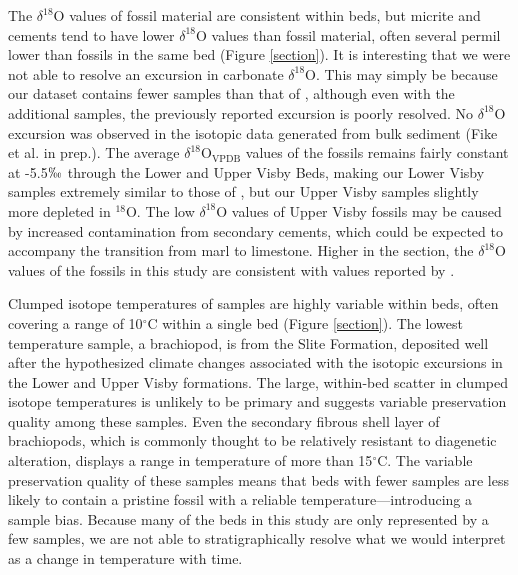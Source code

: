 \documentclass[5p, authoryear]{elsarticle}
\begin{document}
The $\delta^{18}$O values of fossil material are consistent within beds, but micrite and cements tend to have lower $\delta^{18}$O values than fossil material, often several permil lower than fossils in the same bed (Figure \ref{section}). It is interesting that we were not able to resolve an excursion in carbonate $\delta^{18}$O. This may simply be because our dataset contains fewer samples than that of \cite{Munnecke2003}, although even with the additional samples, the previously reported excursion is poorly resolved. No $\delta^{18}$O excursion was observed in the isotopic data generated from bulk sediment (Fike et al. in prep.). The average $\delta^{18}$O$_{\text{VPDB}}$ values of the fossils remains fairly constant at -5.5$\permil$ through the Lower and Upper Visby Beds, making our Lower Visby samples extremely similar to those of \cite{Munnecke2003}, but our Upper Visby samples slightly more depleted in $^{18}$O. The low $\delta^{18}$O values of Upper Visby fossils may be caused by increased contamination from secondary cements, which could be expected to accompany the transition from marl to limestone. Higher in the section, the $\delta^{18}$O values of the fossils in this study are consistent with values reported by \cite{Bickert1997}. 

Clumped isotope temperatures of samples are highly variable within beds, often covering a range of 10$^{\circ}$C within a single bed (Figure \ref{section}). The lowest temperature sample, a brachiopod, is from the Slite Formation, deposited well after the hypothesized climate changes associated with the isotopic excursions in the Lower and Upper Visby formations. The large, within-bed scatter in clumped isotope temperatures is unlikely to be primary and suggests variable preservation quality among these samples. Even the secondary fibrous shell layer of brachiopods, which is commonly thought to be relatively resistant to diagenetic alteration, displays a range in temperature of more than 15$^{\circ}$C. The variable preservation quality of these samples means that beds with fewer samples are less likely to contain a pristine fossil with a reliable temperature---introducing a sample bias. Because many of the beds in this study are only represented by a few samples, we are not able to stratigraphically resolve what we would interpret as a change in temperature with time. 
\end{document}
